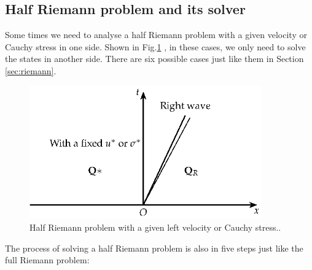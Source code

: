 \documentclass[review]{elsarticle}
\begin{document}
\begin{enumerate}[Step 1]
%
%
%
\section{Half Riemann problem and its solver}
Some times we need to analyse a half Riemann problem with a given velocity or Cauchy stress in one side. Shown in Fig.\ref{fig:half} , in these cases, we only need to solve the states in another side. There are six possible cases just like them in Section \ref{sec:riemann}.

\begin{figure}
  \centering
  \includegraphics[width= 10cm] {Tikz-figure8.eps}
  \caption{Half Riemann problem  with a given left velocity or Cauchy stress..}
  \label{fig:half}
\end{figure}

The process of solving a half Riemann problem is also in five steps just like the full Riemann problem:


\end{enumerate}
\end{document}
